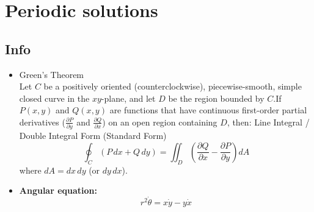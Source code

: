 \chapter{Periodic solutions}
\section*{Info}
\begin{itemize}
    \item Green's Theorem\\
    Let $C$ be a positively oriented (counterclockwise), piecewise-smooth, simple closed curve in the $xy$-plane, and let $D$ be the region bounded by $C$.If $P(x, y)$ and $Q(x, y)$ are functions that have continuous first-order partial derivatives ($\frac{\partial P}{\partial y}$ and $\frac{\partial Q}{\partial x}$) on an open region containing $D$, then: Line Integral / Double Integral Form (Standard Form)$$\oint_C (P \, dx + Q \, dy) = \iint_D \left( \frac{\partial Q}{\partial x} - \frac{\partial P}{\partial y} \right) dA$$where $dA = dx \, dy$ (or $dy \, dx$).
    \item \textbf{Angular equation:}
\[
r^2 \dot{\theta} = x\dot{y} - y\dot{x}
\]
\end{itemize}